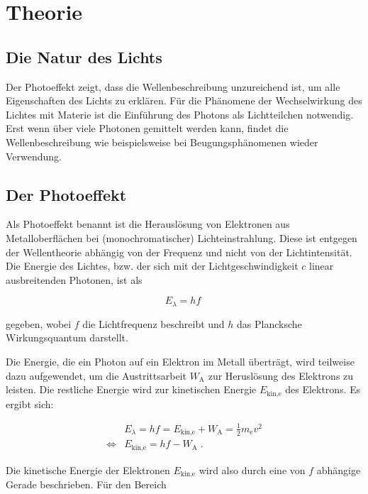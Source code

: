 \section{Theorie}
\label{sec:Theorie}

\subsection{Die Natur des Lichts}

Der Photoeffekt zeigt, dass die Wellenbeschreibung unzureichend ist, um alle Eigenschaften des Lichts
zu erklären. 
Für die Phänomene der Wechselwirkung des Lichtes mit Materie ist die Einführung des Photons als
Lichtteilchen notwendig. Erst wenn über viele Photonen gemittelt werden kann, findet die
Wellenbeschreibung wie beispielsweise bei Beugungsphänomenen wieder Verwendung.

\subsection{Der Photoeffekt}

Als Photoeffekt benannt ist die Herauslösung von Elektronen aus Metalloberflächen bei
(monochromatischer) Lichteinstrahlung. Diese ist entgegen der Wellentheorie abhängig
von der Frequenz und nicht von der Lichtintensität. Die Energie des Lichtes, bzw. der sich mit der 
Lichtgeschwindigkeit $c$ linear ausbreitenden Photonen, ist als

\begin{equation}
    E_\lambda = h f \;
    \label{eqn:lichtenergie}
\end{equation}

gegeben, wobei $f$ die Lichtfrequenz beschreibt und $h$ das Plancksche Wirkungsquantum darstellt.

Die Energie, die ein Photon auf ein Elektron im Metall überträgt, wird teilweise dazu aufgewendet, um die Austrittsarbeit
$W_\text{A}$ zur Heruslösung des Elektrons zu leisten. Die restliche Energie wird zur kinetischen Energie
$E_\text{kin,e}$ des Elektrons. Es ergibt sich:

\begin{align}
    &E_\lambda = h f = E_\text{kin,e} + W_\text{A} = \frac{1}{2} m_\text{e} v^2 \\
    \iff  &E_\text{kin,e} = h f - W_\text{A}  \; .
    \label{eqn:energie}
\end{align}

Die kinetische Energie der Elektronen $E_\text{kin,e}$ wird also durch eine von $f$ abhängige Gerade beschrieben. Für den Bereich

